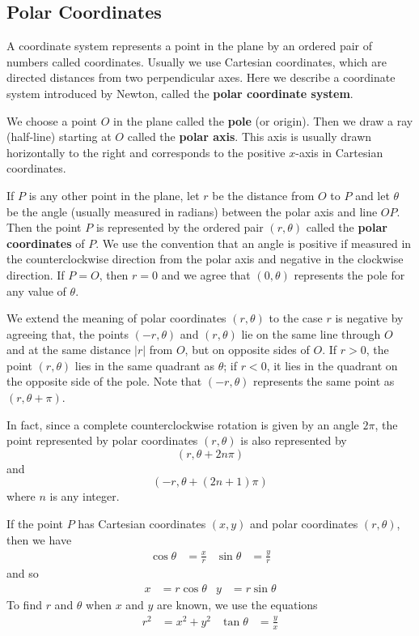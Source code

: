 \subsection{Polar Coordinates}

A coordinate system represents a point in the plane by an ordered pair of
numbers called coordinates.
Usually we use Cartesian coordinates, which are directed distances from two
perpendicular axes.
Here we describe a coordinate system introduced by Newton, called the
\textbf{polar coordinate system}.

We choose a point \(O\) in the plane called the \textbf{pole} (or origin).
Then we draw a ray (half-line) starting at \(O\) called the
\textbf{polar axis}.
This axis is usually drawn horizontally to the right and
corresponds to the positive \(x\)-axis in Cartesian coordinates.

If \(P\) is any other point in the plane, let \(r\) be the distance from \(O\)
to \(P\) and let \(\theta\) be the angle  (usually measured in radians)
between the polar axis and line \(OP\).
Then the point \(P\) is represented by the ordered pair \((r,\theta)\) called
the \textbf{polar coordinates} of \(P\).
We use the convention that an angle is positive if measured in the
counterclockwise direction from the polar axis and negative in the clockwise
direction.
If \(P=O\), then \(r=0\) and we agree that \((0,\theta)\) represents the pole
for any value of \(\theta\).

We extend the meaning of polar coordinates \((r,\theta)\) to the case \(r\) is
negative by agreeing that, the points \((-r,\theta)\) and \((r,\theta)\) lie
on the same line through \(O\) and at the same distance \(|r|\) from \(O\),
but on opposite sides of \(O\).
If \(r>0\), the point \((r,\theta)\) lies in the same quadrant as \(\theta\);
if \(r<0\), it lies in the quadrant on the opposite side of the pole.
Note that \((-r,\theta)\) represents the same point as \((r,\theta+\pi)\).

In fact, since a complete counterclockwise rotation is given by an angle
\(2\pi\), the point represented by polar coordinates \((r,\theta)\) is also
represented by
\[(r,\theta+2n\pi)\]
and
\[(-r,\theta+(2n+1)\pi)\]
where \(n\) is any integer.

If the point \(P\) has Cartesian coordinates \((x,y)\) and polar
coordinates \((r,\theta)\), then we have
\begin{align*}
    \cos\theta &= \frac{x}{r} & \sin\theta &= \frac{y}{r}
\end{align*}
and so
\begin{align*}
    x &= r\cos\theta & y &= r\sin\theta
\end{align*}
To find \(r\) and \(\theta\) when \(x\) and \(y\) are known, we use the
equations
\begin{align*}
    r^2 &= x^2+y^2 & \tan\theta &= \frac{y}{x}
\end{align*}

